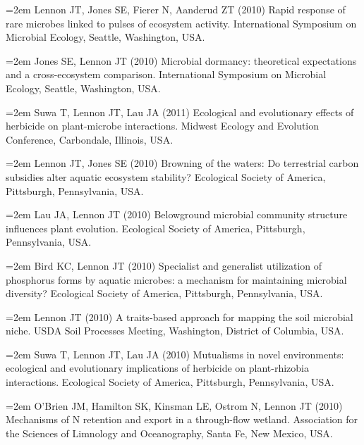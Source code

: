 \documentclass[11pt]{article}
\begin{document}
{\hangindent=2em Lennon JT, Jones SE, Fierer N, Aanderud ZT (2010) Rapid response of rare microbes linked to pulses of ecosystem activity. International Symposium on Microbial Ecology, Seattle, Washington, USA. \par

\hangindent=2em Jones SE, Lennon JT (2010) Microbial dormancy: theoretical expectations and a cross-ecosystem comparison. International Symposium on Microbial Ecology, Seattle, Washington, USA. \par

\hangindent=2em Suwa T, Lennon JT, Lau JA (2011) Ecological and evolutionary effects of herbicide on plant-microbe interactions. Midwest Ecology and Evolution Conference, Carbondale, Illinois, USA. \par

\hangindent=2em Lennon JT, Jones SE (2010) Browning of the waters: Do terrestrial carbon subsidies alter aquatic ecosystem stability? Ecological Society of America, Pittsburgh, Pennsylvania, USA. \par

\hangindent=2em Lau JA, Lennon JT (2010) Belowground microbial community structure influences plant evolution. Ecological Society of America, Pittsburgh, Pennsylvania, USA. \par

\hangindent=2em Bird KC, Lennon JT (2010) Specialist and generalist utilization of phosphorus forms by aquatic microbes: a mechanism for maintaining microbial diversity? Ecological Society of America, Pittsburgh, Pennsylvania, USA. \par

\hangindent=2em Lennon JT (2010) A traits-based approach for mapping the soil microbial niche. USDA Soil Processes Meeting, Washington, District of Columbia, USA. \par

\hangindent=2em Suwa T, Lennon JT, Lau JA (2010) Mutualisms in novel environments: ecological and evolutionary implications of herbicide on plant-rhizobia interactions. Ecological Society of America, Pittsburgh, Pennsylvania, USA. \par

\hangindent=2em O’Brien JM, Hamilton SK, Kinsman LE, Ostrom N, Lennon JT (2010) Mechanisms of N retention and export in a through-flow wetland. Association for the Sciences of Limnology and Oceanography, Santa Fe, New Mexico, USA. \par

}
\end{document}
